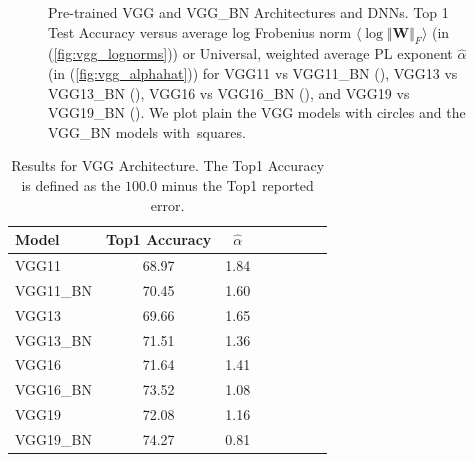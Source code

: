 \begin{figure}[t]
{      \label{fig:vgg_alphahat}
   }
   \caption{%
      Pre-trained VGG and VGG\_BN Architectures and DNNs.  
      Top 1 Test Accuracy versus
      average log Frobenius norm $\langle\log\Vert\mathbf{W}\Vert_{F}\rangle$ (in (\ref{fig:vgg_lognorms}))
      or
      Universal, weighted average PL exponent $\hat{\alpha}$ (in (\ref{fig:vgg_alphahat}))
      for
      VGG11 vs VGG11\_BN ({\color{blue}{blue}}),
      VGG13 vs VGG13\_BN ({\color{orange}{orange}}),
      VGG16 vs VGG16\_BN ({\color{green}{green}}),  and
      VGG19 vs VGG19\_BN ({\color{red}{red}}). 
      We plot plain the VGG models with circles and the VGG\_BN models with~squares.
   }
   \label{fig:vgg}
\end{figure}





\begin{table}[t]
\small
\begin{center}
\begin{tabular}{|p{0.75in}|c|c|c|c|c|c|c|}
\hline
Model & Top1 Accuracy & $\hat{\alpha}$ \\
\hline
VGG11 & 68.97 & 1.84 \\
VGG11\_BN & 70.45 & 1.60 \\
\hline
VGG13 & 69.66 & 1.65 \\
VGG13\_BN & 71.51 & 1.36 \\
\hline
VGG16 & 71.64 & 1.41 \\
VGG16\_BN & 73.52 & 1.08 \\
\hline
VGG19 & 72.08 & 1.16 \\
VGG19\_BN & 74.27 & 0.81 \\
\hline
\end{tabular}
\end{center}
\caption{%
         Results for VGG Architecture.   The Top1 Accuracy is defined
as the $100.0$ minus the Top1 reported error.
         }
\label{table:models_VGG}
\end{table}


